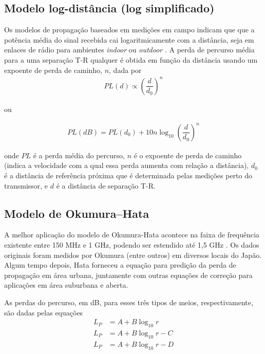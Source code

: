 \subsection{Modelo log-distância (log simplificado)}
\label{sub:log-distancia}

Os modelos de propagação baseados em medições em campo indicam que que a potência média do sinal recebida cai logaritmicamente com a distância, seja em enlaces de rádio para ambientes \textit{indoor} ou \textit{outdoor} \cite{rappaport2009}. A perda de percurso média para a uma separação T-R qualquer é obtida em função da distância usando um expoente de perda de caminho, $n$, dada por
\begin{equation}
	\begin{aligned}
	\label{eq:log-distancia}
		PL(d) \propto \left(\dfrac{d}{d_0}\right)^n
	\end{aligned}
\end{equation}

\noindent ou

\begin{equation}
	\begin{aligned}
	\label{eq:log-distancia-2}
		PL(dB) = PL(d_0) + 10n\log_{10}\left(\dfrac{d}{d_0}\right)^n
	\end{aligned}
\end{equation}

\noindent onde $PL$ é a perda média do percurso, $n$ é o expoente de perda de caminho (indica a velocidade com a qual essa perda aumenta com relação a distância), $d_0$ é a distância de referência próxima que é determinada pelas medições perto do transmissor, e $d$ é a distância de separação T-R.

\subsection{Modelo de Okumura--Hata}
\label{sub:okumura-hata}

A melhor aplicação do modelo de Okumura-Hata acontece na faixa de frequência existente entre 150 MHz e 1 GHz, podendo ser estendido até 1,5 GHz \cite{haykin2008,rappaport2009}. Os dados originais foram medidos por Okumura (entre outros) em diversos locais do Japão. Algum tempo depois, Hata forneceu a equação para predição da perda de propagação em área urbana, juntamente com outras equações de correção para aplicações em área suburbana e aberta.

As perdas do percurso, em dB, para esses três tipos de meios, respectivamente, são dadas pelas equações
\begin{equation}
\begin{split}
	\label{eq:okumura-hata}
		L_P & = A + B\log_{10}r \\
		L_P & = A + B\log_{10}r - C \\
		L_P & = A + B\log_{10}r - D
\end{split}
\end{equation}

